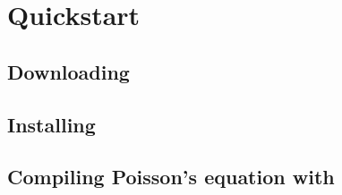 \chapter{Quickstart}

\section{Downloading \ffc{}}

\section{Installing \ffc{}}

\section{Compiling Poisson's equation with \ffc{}}
